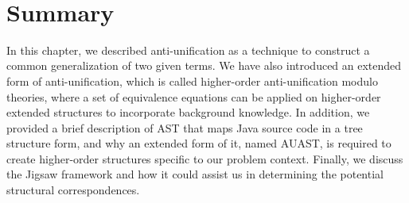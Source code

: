  
\section{Summary}  \label{summary}
In this chapter, we described anti-unification as a technique to construct a common generalization of two given terms. We have also introduced an extended form of anti-unification, which is called higher-order anti-unification modulo theories, where a set of equivalence equations can be applied on higher-order extended structures to incorporate background knowledge. In addition,
we provided a brief description of AST that maps Java source code in a tree structure form, and why an extended form of it, named AUAST, is required to create higher-order structures specific to our problem context. Finally, we discuss the Jigsaw framework and how it could assist us in determining the potential structural correspondences. 
